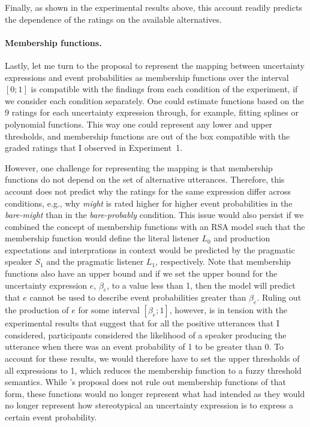 Finally, as shown in the experimental results above, this account readily predicts the dependence of the ratings on the available alternatives.

\paragraph{Membership functions.} Lastly, let me turn to the proposal to represent the mapping between uncertainty expressions and event probabilities
as membership functions over the interval $[0;1]$ is compatible with the findings from each condition of the experiment, 
if we consider each condition separately.  One could estimate functions  based on the 9 ratings for each uncertainty expression through, 
for example, fitting splines or polynomial functions. This way one could represent any lower and upper thresholds, and membership functions 
are out of the box compatible with the graded ratings that I observed in Experiment~1.

However, one challenge for representing the mapping is that membership functions do not depend on the set of alternative utterances. Therefore,
this account does not predict why the ratings for the same expression differ across conditions, e.g., why \textit{might} is rated higher for higher event probabilities in
the \textit{bare-might} than in the \textit{bare-probably} condition. This issue would also persist if we combined the concept of membership functions with an RSA model such that the
membership function would define the literal listener $L_0$ and production expectations and interprations in context would be predicted by the 
pragmatic speaker $S_1$ and the pragmatic listener $L_1$, respectively. Note that membership functions also have an upper bound and if we set the upper bound for 
the uncertainty expression $e$, $\beta_e$, to a value less than 1, then the model will predict that $e$ cannot be used to describe event probabilities greater than $\beta_e$.
Ruling out the production of $e$ for some interval $[\beta_e; 1]$, however, is in tension with the experimental results that suggest that for all the positive utterances that I considered, 
participants considered the likelihood of a speaker producing the utterance when there was an event probability of 1 to be greater than 0. To account for these results, we would therefore 
have to set the upper thresholds of all expressions to 1, which reduces the membership function to a fuzzy threshold semantics. While \cite{Wallsten1986}'s 
proposal does not rule out membership functions of that form, these functions would no longer represent what \cite{Wallsten1986} had intended as they would
no longer represent how stereotypical an uncertainty expression is to express a certain event probability.

